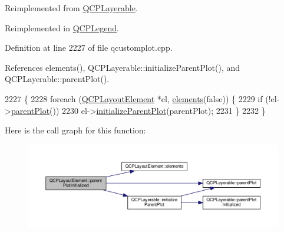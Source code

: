 Reimplemented from \hyperlink{class_q_c_p_layerable_ab20b7dbd8e0249ed61adb9622c427382}{Q\+C\+P\+Layerable}.



Reimplemented in \hyperlink{class_q_c_p_legend_a4d552c63d82742d77fb7f177bae7b1ba}{Q\+C\+P\+Legend}.



Definition at line 2227 of file qcustomplot.\+cpp.



References elements(), Q\+C\+P\+Layerable\+::initialize\+Parent\+Plot(), and Q\+C\+P\+Layerable\+::parent\+Plot().


\begin{DoxyCode}
2227                                                                     \{
2228   \textcolor{keywordflow}{foreach} (\hyperlink{class_q_c_p_layout_element}{QCPLayoutElement} *el, \hyperlink{class_q_c_p_layout_element_a311d60d78e62ef8eaaedb1b6ceb9e788}{elements}(\textcolor{keyword}{false})) \{
2229     \textcolor{keywordflow}{if} (!el->\hyperlink{class_q_c_p_layerable_ab7e0e94461566093d36ffc0f5312b109}{parentPlot}())
2230       el->\hyperlink{class_q_c_p_layerable_a8cbe5a0c9a5674249982f5ca5f8e02bc}{initializeParentPlot}(parentPlot);
2231   \}
2232 \}
\end{DoxyCode}


Here is the call graph for this function\+:\nopagebreak
\begin{figure}[H]
\begin{center}
\leavevmode
\includegraphics[width=350pt]{class_q_c_p_layout_element_a1478899e80e8244b411e96ec3b2e5ce2_cgraph}
\end{center}
\end{figure}


\hypertarget{class_q_c_p_layout_element_affdfea003469aac3d0fac5f4e06171bc}{}
